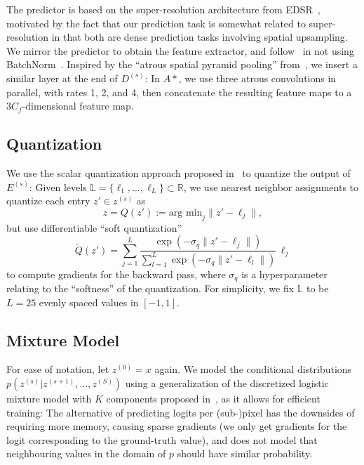 \documentclass[10pt,twocolumn,letterpaper]{article}
\newcommand{\zunquantized}{z'}
\newcommand{\R}{\mathbb{R}}
\newcommand{\levels}{\mathbb{L}}
\newcommand{\level}{\ell}
\newcommand{\sigmaq}{\sigma_q}
\begin{document}
The predictor is based on the super-resolution architecture from EDSR~\cite{Lim_2017_CVPR_Workshops}, motivated by the fact that our prediction task is somewhat related to super-resolution in that both are dense prediction tasks involving spatial upsampling. We mirror the predictor to obtain the feature extractor, and follow~\cite{Lim_2017_CVPR_Workshops} in not using BatchNorm~\cite{ioffe2017batch}.
Inspired by the ``atrous spatial pyramid pooling'' from~\cite{chen2017rethinking}, we insert a similar layer at the end of $D^{(s)}$: In $A*$, we use three atrous convolutions in parallel, with rates 1, 2, and 4, then concatenate the resulting feature maps to a $3C_f$-dimensional feature map. 



\subsection{Quantization}\label{sec:quantization}


We use the scalar quantization approach proposed in~\cite{mentzer2018cvpr} to quantize the output of $E^{(s)}$: Given levels $\levels = \{\level_1, \dots, \level_L\} \subset \R$, we use nearest neighbor assignments to quantize each entry $z' \in z^{(s)}$ as
\begin{equation} \label{eq:hardquant}
z = Q(\zunquantized) := \text{arg min}_{j} \|\zunquantized-\level_j\|,
\end{equation}
but use differentiable ``soft quantization''
\begin{equation} \label{eq:softquant}
\tilde Q(\zunquantized) = \sum_{j=1}^L  \frac{\exp(-\sigmaq\|\zunquantized-\level_j\|)}{\sum_{l=1}^L \exp(-\sigmaq\|\zunquantized-\level_l\|)} \, \level_j
\end{equation}
to compute gradients for the backward pass, where $\sigmaq$ is a hyperparameter relating to the ``softness'' of the quantization. 
For simplicity, we fix $\levels$ to be $L=25$ evenly spaced values in $[-1, 1]$. 


\subsection{Mixture Model} \label{sec:mixture_model}

For ease of notation, let $z^{(0)}=x$ again. We model the conditional distributions
$p(z^{(s)}|z^{(s+1)}, \ldots, z^{(S)})$
using a generalization of the discretized logistic mixture model with $K$ components proposed in~\cite{Salimans2017pcnnpp}, as it allows for efficient training: 
The alternative of predicting logits per \mbox{(sub-)pixel} has the downsides of requiring more memory, causing sparse gradients (we only get gradients for the logit corresponding to the ground-truth value), and does not model that neighbouring values in the domain of $p$ should have similar probability. 
\end{document}
